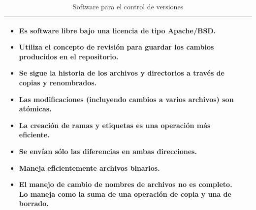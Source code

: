 \begin{table}[b!]
\begin{tabular}{|p{2cm}|ll}
          \multicolumn{1}{p{10cm}|}{
          \begin{itemize}
          \vspace{-35mm}
          \item Es software libre bajo una licencia de tipo Apache/BSD.
        \item Utiliza el concepto de revisión para guardar los cambios producidos en el repositorio.         
        \item  Se sigue la historia de los archivos y directorios a través de copias y renombrados.
      	\item Las modificaciones (incluyendo cambios a varios archivos) son atómicas.
      	\item La creación de ramas y etiquetas es una operación más eficiente.
      	\item Se envían sólo las diferencias en ambas direcciones.
      	\item Maneja eficientemente archivos binarios.
      	\item El manejo de cambio de nombres de archivos no es completo. Lo maneja como la suma de una operación de copia y una de 	borrado. \cite{39}
      \end{itemize}} \\ 
       \hline
      \end{tabular}
      \caption{Software para el control de versiones}
      \label{table: comparacion control de versiones}
    \end{table}

